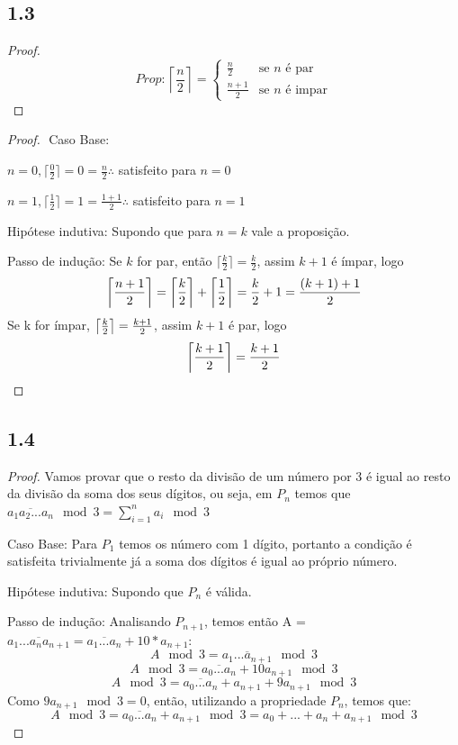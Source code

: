 \documentclass{article}
\DeclarePairedDelimiter\ceil{\lceil}{\rceil}
\begin{document}
\subsection*{1.3}
\begin{proof}
$ $\newline
  \[Prop:
    \left \lceil\frac{n}{2} \right \rceil=
    \left\{
    \begin{array}{ll}
    \frac{n}{2}& \textrm{se $n$ é par}\\
    \frac{n+1}{2}& \textrm{se $n$ é impar}
    \end{array}
    \right.
  \]
\end{proof}

\begin{proof}
$ $\newline
Caso Base: 

$n=0,\lceil\frac{0}{2}\rceil=0=\frac{n}{2}\therefore$ satisfeito para $n=0$

$n=1,\lceil\frac{1}{2}\rceil=1=\frac{1+1}{2}\therefore$ satisfeito para $n=1$

Hipótese indutiva: Supondo que para $n=k$ vale a proposição.

Passo de indução: Se $k$ for par, então $\lceil\frac{k}{2} \rceil = \frac{k}{2}$, assim
$k+1$ é ímpar, logo
$$
\ceil*{\frac{n+1}{2}} = \ceil*{\frac{k}{2}} + \ceil*{\frac{1}{2}} =\frac{k}{2}+1 = \frac{(k+1)+1}{2}
$$
Se k for ímpar, $\ceil*{\frac{k}{2}} = \frac{k+1}{2}$, assim $k+1$ é par, logo
$$\ceil*{\frac{k+1}{2}}=\frac{k+1}{2}$$
\end{proof}


\subsection*{1.4}
\begin{proof}
Vamos provar que o resto da divisão de um número por 3 é igual ao resto da divisão da soma
dos seus dígitos, ou seja, em $P_n$ temos que $\overline{a_1a_2...a_n} \mod 3 = \sum_{i=1}^n{a_i} \mod 3$

Caso Base: Para $P_1$ temos os número com 1 dígito, portanto a condição é satisfeita trivialmente já
a soma dos dígitos é igual ao próprio número.

Hipótese indutiva: Supondo que $P_n$ é válida.

Passo de indução: Analisando $P_{n+1}$, temos então A = $\overline{a_1...a_na_{n+1}} = \overline{a_1...a_n}+10*a_{n+1}$:
$$A \mod 3 = \overline{a_1...a_{n+1}} \mod 3$$
$$A \mod 3 = \overline{a_0...a_n} + 10a_{n+1} \mod 3$$
$$A \mod 3 = \overline{a_0...a_n} + a_{n+1} +9a_{n+1} \mod 3$$
Como $9a_{n+1} \mod 3 = 0$, então, utilizando a propriedade $P_n$, temos que:
$$A \mod 3 = \overline{a_0...a_n} + a_{n+1} \mod 3 = a_0 + ... + a_n + a_{n+1} \mod 3$$
\end{proof}
\end{document}
